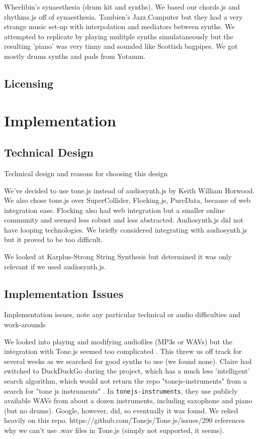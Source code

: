 \documentclass[12pt,a4paper]{article}
\newcommand{\lightcode}[1]{\colorbox{light-gray}{\texttt{#1}}}
\begin{document}
Wheelibin's synaesthesia (drum kit and synths). We based our chords.js and rhythms.js off of synaesthesia. Tambien's Jazz.Computer but they had a very strange music set-up with interpolation and mediators between synths. We attempted to replicate by playing mulitple synths simulataneously but the resulting 'piano' was very tinny and sounded like Scottish bagpipes. We got mostly drums synths and pads from Yotamm.

\subsection{Licensing}


\section{Implementation}
\subsection{Technical Design}
Technical design and reasons for choosing this design

We've decided to use tone.js instead of audiosynth.js by Keith William Horwood. We also chose tone.js over SuperCollider, Flocking.js, PureData, because of web integration ease. Flocking also had web integration but a smaller online community and seemed less robust and less abstracted. Audiosynth.js did not have looping technologies. We briefly considered integrating with audiosynth.js but it proved to be too difficult.

We looked at Karplus-Strong String Synthesis but determined it was only relevant if we used audiosynth.js.

\subsection{Implementation Issues}
Implementation issues, note any particular technical or audio difficulties and work-arounds

We looked into playing and modifying audiofiles (MP3s or WAVs) but the integration with Tone.js seemed too complicated \cite{tonejs-issue}. This threw us off track for several weeks as we searched for good synths to use (we found none). Claire had switched to DuckDuckGo during the project, which has a much less 'intelligent' search algorithm, which would not return the repo "tonejs-instruments" from a search for "tone js instruments" \cite{tonejs-instruments}. In \lightcode{tonejs-instruments}, they use publicly available WAVs from about a dozen instruments, including saxophone and piano (but no drums). Google, however, did, so eventually it was found. We relied heavily on this repo. https://github.com/Tonejs/Tone.js/issues/290 references why we can't use .wav files in Tone.js (simply not supported, it seems). 
\end{document}
